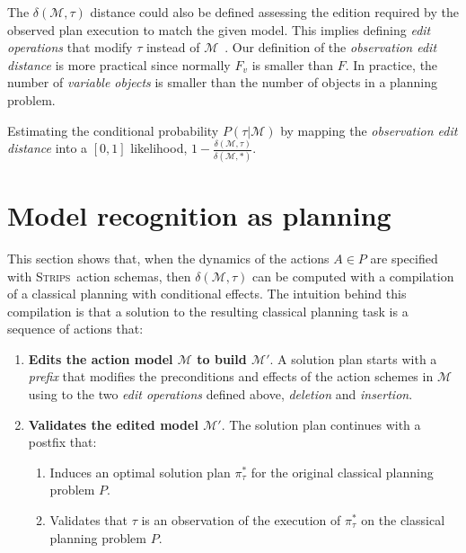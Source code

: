\documentclass[letterpaper]{article} %
\newcommand{\strips}{\textsc{Strips}}     %
\begin{document}
The $\delta(\mathcal{M},\tau)$ distance could also be defined assessing the edition required by the observed plan execution to match the given model. This implies defining {\em edit operations} that modify $\tau$ instead of $\mathcal{M}$~\cite{sohrabi:precognition:IJCAI2016}. Our definition of the {\em observation edit distance} is more practical since normally $F_v$ is smaller than $F$. In practice, the number of {\em variable objects} is smaller than the number of objects in a planning problem.

Estimating the conditional probability $P(\tau|\mathcal{M})$ by mapping the {\em observation edit distance} into a $[0,1]$ likelihood, $1-\frac{\delta(\mathcal{M},\tau)}{\delta(\mathcal{M},*)}$.



\section{Model recognition as planning}
This section shows that, when the dynamics of the actions $A\in P$ are specified with \strips\ action schemas, then $\delta(\mathcal{M},\tau)$ can be computed with a compilation of a classical planning with conditional effects. The intuition behind this compilation is that a solution to the resulting classical planning task is a sequence of actions that:
\begin{enumerate}
\item {\bf Edits the action model $\mathcal{M}$ to build $\mathcal{M}'$}. A solution plan starts with a {\em prefix} that modifies the preconditions and effects of the action schemes in $\mathcal{M}$ using to the two {\em edit operations} defined above, {\em deletion} and {\em insertion}. 
\item {\bf Validates the edited model $\mathcal{M}'$}. The solution plan continues with a postfix that:
\begin{enumerate}
\item Induces an optimal solution plan $\pi^*_\tau$ for the original classical planning problem $P$.
\item Validates that $\tau$ is an observation of the execution of $\pi^*_\tau$ on the classical planning problem $P$.
\end{enumerate}
\end{enumerate}
\end{document}
